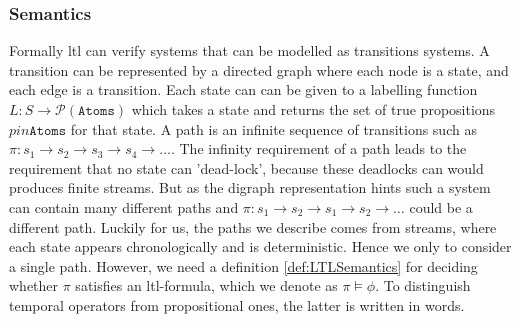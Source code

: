 \subsubsection{Semantics}
Formally \acrshort{ltl} can verify systems that can be modelled as transitions systems. A transition can be represented by a directed graph where each node is a state, and each edge is a transition. Each state can can be given to a labelling function $L: S \rightarrow \mathcal{P}(\texttt{Atoms})$ which takes a state and returns the set of true propositions $p in \texttt{Atoms}$ for that state. A path is an infinite sequence of transitions such as $\pi: s_1 \rightarrow s_2 \rightarrow s_3 \rightarrow s_4 \rightarrow \dots $. 
The infinity requirement of a path leads to the requirement that no state can 'dead-lock', because these deadlocks can would produces finite streams. 
But as the digraph representation hints such a system can contain many different paths and $\pi: s_1 \rightarrow s_2 \rightarrow s_1 \rightarrow s_2 \rightarrow  \dots $ could be a different path.
Luckily for us, the paths we describe comes from streams, where each state appears chronologically and is deterministic. Hence we only to consider a single path. However, we need a definition \ref{def:LTLSemantics} for deciding whether $\pi$ satisfies an \acrshort{ltl}-formula, which we denote as $\pi \vDash \phi$. 
To distinguish temporal operators from propositional ones, the latter is written in words. 

